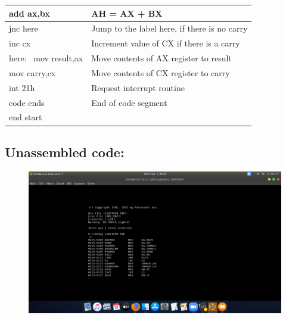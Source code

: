 \documentclass[12pt,a4paper]{article}
\begin{document}
\begin{flushleft}
\begin{table}[htb]
{\begin{tabular}{|l|l|}
\hline
add ax,bx                                                        & AH = AX + BX                                  \\ 
\hline
jnc here                                                         & Jump to the label here, if there is no carry  \\ 
\hline
inc cx                                                           & Increment value of CX if there is a carry     \\ 
\hline
here:~ mov result,ax                                             & Move contents of AX register to result        \\ 
\hline
mov carry,cx                                                     & Move contents of CX register to carry         \\ 
\hline
int 21h                                                          & Request interrupt routine                     \\ 
\hline
code ends                                                        & End of code segment                           \\
\hline
end start                                                        &                                               \\
\hline
\end{tabular}
}
\end{table}

\newpage
\subsection*{\textbf{Unassembled code:}}
\begin{figure}[h]
    \centering
    \includegraphics[trim = 100mm 60mm 150mm 127mm, clip, width = \textwidth]{Pics/AdditionUS.png}
\end{figure}

\end{flushleft}
\end{document}
